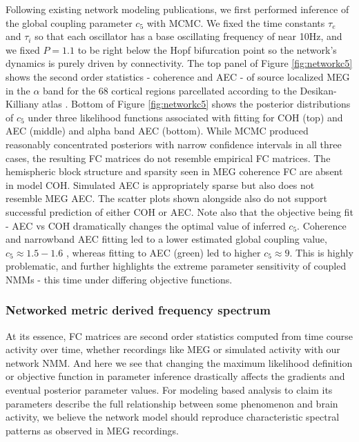 Following existing network modeling publications, we first performed inference of the global coupling parameter $c_5$ with MCMC. We fixed the time constants $\tau_e$ and $\tau_i$ so that each oscillator has a base oscillating frequency of near 10Hz, and we fixed $P = 1.1$ to be right below the Hopf bifurcation point so the network's dynamics is purely driven by connectivity. The top panel of Figure \ref{fig:networkc5} shows the second order statistics - coherence and AEC - of source localized MEG in the $\alpha$ band for the $68$ cortical regions parcellated according to the Desikan-Killiany atlas \cite{Desikan2006}. Bottom of Figure \ref{fig:networkc5} shows the posterior distributions of $c_5$ under three likelihood functions associated with fitting for COH (top) and AEC (middle) and alpha band AEC (bottom). While MCMC produced reasonably concentrated posteriors with narrow confidence intervals in all three cases, the resulting FC matrices do not resemble empirical FC matrices. The hemispheric block structure and sparsity seen in MEG coherence FC are absent in model COH. Simulated AEC is appropriately sparse but also does not resemble MEG AEC. The scatter plots shown alongside also do not support successful prediction of either COH or AEC. Note also that the objective being fit - AEC vs COH dramatically changes the optimal value of inferred $c_5$. Coherence and narrowband AEC fitting led to a lower estimated global coupling value, $c_5 \approx 1.5-1.6$ , whereas fitting to AEC (green) led to higher $c_5 \approx 9$. This is highly problematic, and further highlights the extreme parameter sensitivity of coupled NMMs - this time under differing objective functions.

\subsubsection{Networked metric derived frequency spectrum}
At its essence, FC matrices are second order statistics computed from time course activity over time, whether recordings like MEG or simulated activity with our network NMM. And here we see that changing the maximum likelihood definition or objective function in parameter inference drastically affects the gradients and eventual posterior parameter values. For modeling based analysis to claim its parameters describe the full relationship between some phenomenon and brain activity, we believe the network model should reproduce characteristic spectral patterns as observed in MEG recordings.


